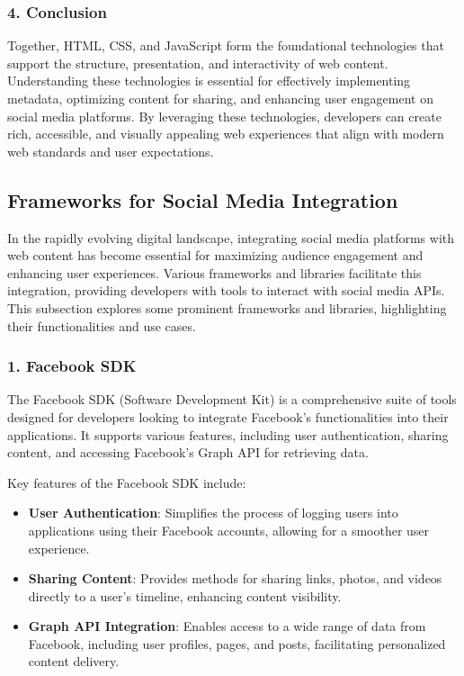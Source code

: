 \subsubsection{4. Conclusion}

Together, HTML, CSS, and JavaScript form the foundational technologies that support the structure, presentation, and interactivity of web content. Understanding these technologies is essential for effectively implementing metadata, optimizing content for sharing, and enhancing user engagement on social media platforms. By leveraging these technologies, developers can create rich, accessible, and visually appealing web experiences that align with modern web standards and user expectations.

\subsection{Frameworks for Social Media Integration}
\label{subsec:frameworks_for_social_media_integration}

In the rapidly evolving digital landscape, integrating social media platforms with web content has become essential for maximizing audience engagement and enhancing user experiences. Various frameworks and libraries facilitate this integration, providing developers with tools to interact with social media APIs. This subsection explores some prominent frameworks and libraries, highlighting their functionalities and use cases.

\subsubsection{1. Facebook SDK}

The Facebook SDK (Software Development Kit) is a comprehensive suite of tools designed for developers looking to integrate Facebook's functionalities into their applications. It supports various features, including user authentication, sharing content, and accessing Facebook's Graph API for retrieving data.

Key features of the Facebook SDK include:
\begin{itemize}
    \item \textbf{User Authentication}: Simplifies the process of logging users into applications using their Facebook accounts, allowing for a smoother user experience.
    \item \textbf{Sharing Content}: Provides methods for sharing links, photos, and videos directly to a user's timeline, enhancing content visibility.
    \item \textbf{Graph API Integration}: Enables access to a wide range of data from Facebook, including user profiles, pages, and posts, facilitating personalized content delivery.
\end{itemize}

